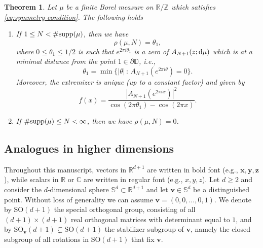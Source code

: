 \documentclass[reqno, a4paper]{amsart}
\def\R{\mathbb{R}}
\def\C{\mathbb{C}}
\def\T{\mathbb{R}/\mathbb{Z}}
\def\supp{{\rm supp}}
\renewcommand{\d}{\text{\rm d}}
\newcommand{\dD}{\partial\mathbb{D}}
\newcommand{\Sd}{\mathbb{S}^d}
\theoremstyle{plain}
\newtheorem{theorem}{Theorem}
\theoremstyle{definition}
\theoremstyle{remarkstyle}
\numberwithin{equation}{section}
\begin{document}
\begin{theorem}\label{thm:best-radius-of-negativity}
    Let $\mu$ be a finite Borel measure on $\T$ which satisfies \eqref{eq:symmetry-condition}. The following holds
    \begin{enumerate}[label=\textnormal{(\roman*)}]
        \item If  $1\leq N<\#\supp(\mu)$, then we have 
    \begin{equation*}
        \rho(\mu, N)=\theta_1,
    \end{equation*}
    where $0\leq \theta_1\leq 1/2$ is such that $e^{2\pi i \theta_1}$ is a zero of $A_{N+1}(z;\d\mu)$ which is at a minimal distance from the point $1\in\dD$, i.e., 
    \begin{equation*}
        \theta_1=\min\{|\theta|\, : \, A_{N+1}(e^{2\pi i \theta})=0\}.
    \end{equation*}
    Moreover, the extremizer is unique (up to a constant factor) and given by 
    \begin{equation}\label{eq:extremizer-function}
       f(x)=\frac{|A_{N+1}(e^{2\pi i x})|^2}{\cos(2\pi \theta_1)-\cos(2\pi x)}.
    \end{equation}
    \item If $\#\supp(\mu)\leq N<\infty$, then we have $\rho(\mu, N)=0$.
    \end{enumerate}
    
\end{theorem}


\medskip

\subsection{Analogues in higher dimensions}
Throughout this manuscript, vectors in $\R^{d+1}$ are written in bold font 
(e.g., $\bm{x}, \bm{y}, \bm{z}$), while scalars in $\R$ or $\C$ are written in regular font (e.g., $x, y, z$). Let $d\geq 2$  and consider the $d$-dimensional sphere $\Sd \subset \R^{d+1}$ and let $\bm{v} \in \Sd$ be a distinguished point. Without loss of generality we can assume $\bm{v}=(0, 0, \ldots, 0 , 1)$. We denote by $\mathrm{SO}(d+1)$ the special orthogonal group, consisting of all $(d+1) \times (d+1)$ real orthogonal matrices with determinant equal to $1$, and by $\mathrm{SO}_{\bm{v}}(d+1) \subsetneq \mathrm{SO}(d+1)$ the stabilizer subgroup of $\bm{v}$, namely the closed subgroup of all rotations in $\mathrm{SO}(d+1)$ that fix $\bm{v}$.
\end{document}
